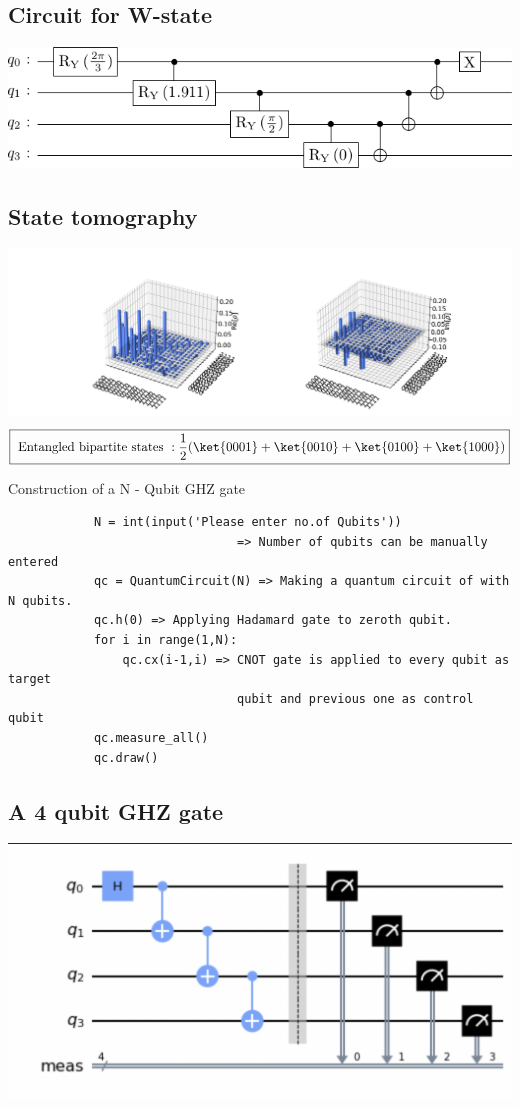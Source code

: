 \documentclass[a4paper]{article}
\begin{document}
    \begin{answer}[Question 4]
        \subsection*{Circuit for W-state}
        \includegraphics[scale = 0.6]{w-4-state.png}
        \subsection*{State tomography}
        \includegraphics[scale = 0.3]{tomography.png}
        \[
            \boxed{\text{ Entangled bipartite states }: \frac{1}{2}(\ket{0001}+\ket{0010}+\ket{0100}+\ket{1000})}
        \]
    \end{answer}
    \begin{answer}[Question 5 a]
        Construction of a N - Qubit GHZ gate
        \begin{verbatim}
            N = int(input('Please enter no.of Qubits')) 
                                => Number of qubits can be manually entered 
            qc = QuantumCircuit(N) => Making a quantum circuit of with N qubits. 
            qc.h(0) => Applying Hadamard gate to zeroth qubit.
            for i in range(1,N):
                qc.cx(i-1,i) => CNOT gate is applied to every qubit as target
                                qubit and previous one as control qubit
            qc.measure_all()
            qc.draw()
        \end{verbatim}
        \subsection*{A 4 qubit GHZ gate}
        \includegraphics[scale = 0.7]{5a.png}
    \end{answer}
\end{document}
